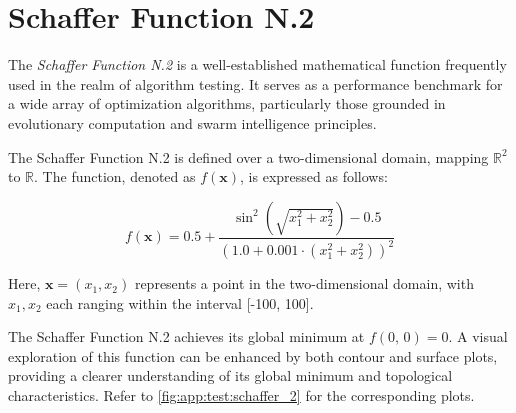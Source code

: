 \section{Schaffer Function N.2}
  The \emph{Schaffer Function N.2} is a well-established mathematical function
  frequently used in the realm of algorithm testing.
  It serves as a performance benchmark for a wide array of optimization
  algorithms, particularly those grounded in evolutionary computation and swarm 
  intelligence principles.

  \begin{definition}
    The Schaffer Function N.2 is defined over a two-dimensional domain, mapping 
    \(\mathbb{R}^2\) to \(\mathbb{R}\).
    The function, denoted as \(f(\mathbf{x})\), is expressed as follows:

    \[
      f(\mathbf{x}) = 0.5 + \frac{
          \sin^2(\sqrt{x_1^2 + x_2^2}) - 0.5
        }{
          (1.0 + 0.001 \cdot (x_1^2 + x_2^2))^2
        }
    \]

    Here, \(\mathbf{x} = (x_1, x_2)\) represents a point in the two-dimensional
     domain, with \(x_1, x_2\) each ranging within the interval [-100, 100].
  \end{definition}

  The Schaffer Function N.2 achieves its global minimum at \(f(0,\,0) = 0\).
  A visual exploration of this function can be enhanced by both contour and 
  surface plots, providing a clearer understanding of its global minimum and 
  topological characteristics.
  Refer to \vref{fig:app:test:schaffer_2} for the corresponding plots.

